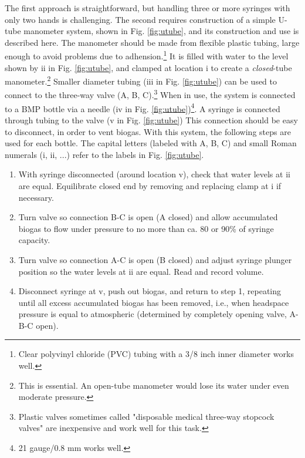 \documentclass[]{article}
\begin{document}
\begin{itemize}
The first approach is straightforward, but handling three or more syringes with only two hands is challenging.
The second requires construction of a simple U-tube manometer system, shown in Fig. \ref{fig:utube}, and its construction and use is described here.
The manometer should be made from flexible plastic tubing, large enough to avoid problems due to adhension.\footnote{Clear polyvinyl chloride (PVC) tubing with a 3/8 inch inner diameter works well.}
It is filled with water to the level shown by ii in Fig. \ref{fig:utube}, and clamped at location i to create a \textit{closed}-tube manometer.\footnote{This is essential. An open-tube manometer would lose its water under even moderate pressure.}
Smaller diameter tubing (iii in Fig. \ref{fig:utube}) can be used to connect to the three-way valve (A, B, C).\footnote{Plastic valves sometimes called "disposable medical three-way stopcock valves" are inexpensive and work well for this task.}
When in use, the system is connected to a BMP bottle via a needle (iv in Fig. \ref{fig:utube})\footnote{21 gauge/0.8 mm works well.}.
A syringe is connected through tubing to the valve (v in Fig. \ref{fig:utube})
This connection should be easy to disconnect, in order to vent biogas.
With this system, the following steps are used for each bottle.
The capital letters (labeled with A, B, C) and small Roman numerals (i, ii, ...) refer to the labels in Fig. \ref{fig:utube}.
\begin{enumerate}
  \item With syringe disconnected (around location v), check that water levels at ii are equal. Equilibrate closed end by removing and replacing clamp at i if necessary.
  \item Turn valve so connection B-C is open (A closed) and allow accumulated biogas to flow under pressure to no more than ca. 80 or 90\% of syringe capacity.
  \item Turn valve so connection A-C is open (B closed) and adjust syringe plunger position so the water levels at ii are equal. Read and record volume.
  \item Disconnect syringe at v, push out biogas, and return to step 1, repeating until all excess accumulated biogas has been removed, i.e., when headspace pressure is equal to atmospheric (determined by completely opening valve, A-B-C open).
\end{enumerate}


\end{itemize}
\end{document}
